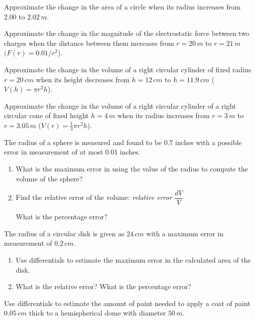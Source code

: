 \documentclass[answers]{exam}
\begin{document}
\begin{ex*}
  Approximate the change in the area of a circle when its radius increases from $2.00$ to $2.02\,m$.
\end{ex*}

\begin{ex*}
  Approximate the change in the magnitude of the electrostatic force between two charges when the distance between them increases from $r=20\,m$ to $r=21\,m$ $(F(r)=0.01/r^2$).
\end{ex*}
\pagebreak

\begin{ex*}
  Approximate the change in the volume of a right circular cylinder of fixed radius $r=20\,cm$ when its height decreases from $h=12\,cm$ to $h=11.9\,cm$ ($V(h)=\pi r^2h$).
\end{ex*}

\begin{ex*}
  Approximate the change in the volume of a right circular cylinder of a right circular cone of fixed height $h=4\,m$ when its radius increases from $r=3\,m$ to $r=3.05\,m$ ($V(r)=\frac{1}{3}\pi r^2 h$).
\end{ex*}
\pagebreak

\begin{ex*}
  The radius of a sphere is measured and found to be $0.7$ inches with a possible error in measurement of at most 0.01 inches.
\end{ex*}
\begin{enumerate}[label=\alph*), itemsep=\stretch{1}]
  \item What is the maximum error in using the value of the radius to compute the volume of the sphere?
  \item Find the relative error of the volume: \hfill\textit{relative error} $\dfrac{dV}{V}$\hspace*{50pt}
  
  What is the percentage error?
\end{enumerate}
\pagebreak

\begin{ex*}
  The radius of a circular disk is given as $24\,cm$ with a maximum error in measurement of $0.2\,cm$.
\end{ex*}
\begin{enumerate}[label=\alph*), itemsep=\stretch{1}]
  \item Use differentials to estimate the maximum error in the calculated area of the disk.
  \item What is the relative error? What is the percentage error?
\end{enumerate}
\pagebreak

\begin{ex*}
  Use differentials to estimate the amount of paint needed to apply a coat of paint $0.05\,cm$ thick to a hemispherical dome with diameter $50\,m$.
\end{ex*}
\pagebreak
\end{document}
